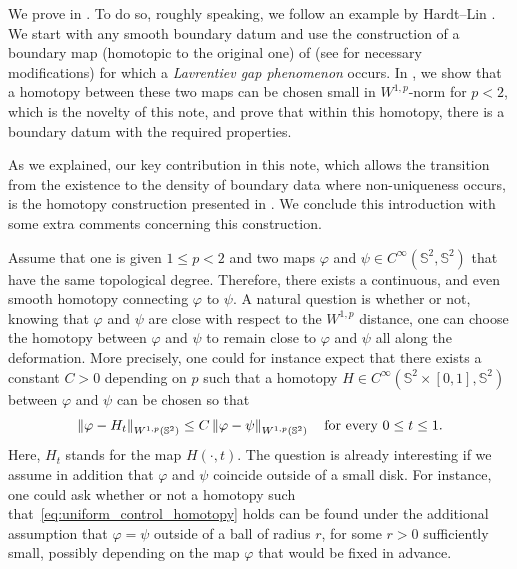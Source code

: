 \documentclass[12pt]{amsart}
\def\S{{\mathbb S}}
\newcommand{\norm}[1]{\left\|{#1}\right\|}
\numberwithin{theorem}{section} \numberwithin{equation}{section}
\begin{document}
We prove  in . 
To do so, roughly speaking, we follow an example by Hardt--Lin \cite[Section 5]{HardtLin89}. 
We start with any smooth boundary datum and use the construction of a boundary map (homotopic to the original one) of \cite{MazowieckaStrzelecki} (see \cite{MazowieckaPhD} for necessary modifications) for which a \emph{Lavrentiev gap phenomenon} occurs. 
In , we show that a homotopy between these two maps can be chosen small in $W^{1,p}$-norm for $p<2$, which is the novelty of this note, and prove that within this homotopy, there is a boundary datum with the required properties.

As we explained, our key contribution in this note, which allows the transition from the existence to the density of boundary data where non-uniqueness occurs, is the homotopy construction presented in .
We conclude this introduction with some extra comments concerning this construction.

Assume that one is given \( 1 \leq p < 2 \) and two maps \( \varphi \) and \( \psi \in C^{\infty}(\S^{2},\S^{2}) \) that have the same topological degree.
Therefore, there exists a continuous, and even smooth homotopy connecting \( \varphi \) to \( \psi \).
A natural question is whether or not, knowing that \( \varphi \) and \( \psi \) are close with respect to the \( W^{1,p} \) distance, one can choose the homotopy between \( \varphi \) and \( \psi \) to remain close to \( \varphi \) and \( \psi \) all along the deformation.
More precisely, one could for instance expect that there exists a constant \( C > 0 \) depending on \( p \) such that a homotopy \( H \in C^{\infty}(\S^{2} \times [0,1],\S^{2}) \) between \( \varphi \) and \( \psi \) can be chosen so that
\begin{equation}
\label{eq:uniform_control_homotopy}
	\norm{\varphi - H_{t}}_{W^{1,p}(\S^{2})} \leq C\norm{\varphi - \psi}_{W^{1,p}(\S^{2})}
	\quad
	\text{for every \( 0 \leq t \leq 1\).}
\end{equation}
Here, \( H_{t} \) stands for the map \( H(\cdot,t) \).
The question is already interesting if we assume in addition that \( \varphi \) and \( \psi \) coincide outside of a small disk.
For instance, one could ask whether or not a homotopy such that~\eqref{eq:uniform_control_homotopy} holds can be found under the additional assumption that \( \varphi = \psi \) outside of a ball of radius \( r \), for some \( r > 0 \) sufficiently small, possibly depending on the map \( \varphi \) that would be fixed in advance.
\end{document}
